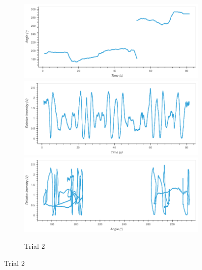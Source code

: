 \begin{figure}

\caption{All plots}

\newlength{\plotwidth}
\setlength{\plotwidth}{0.33\textwidth}


\begin{subfigure}{1.0\textwidth}
\caption{Trial 2}
\includegraphics[width=\plotwidth]{plots/t2-time-angle.png}
\includegraphics[width=\plotwidth]{plots/t2-time-intensity.png}
\includegraphics[width=\plotwidth]{plots/t2-angle-intensity.png}
\end{subfigure}




\end{figure}
